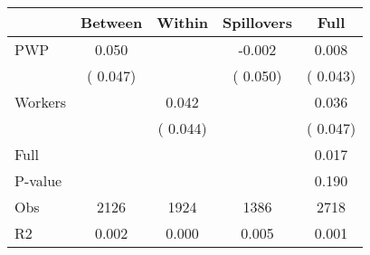 
\begin{tabular}{l*{4}{c}}\hline&\multicolumn{1}{c}{Between}&\multicolumn{1}{c}{Within}&\multicolumn{1}{c}{Spillovers}&\multicolumn{1}{c}{Full}\\ \hline
 PWP           &              0.050      &                                               &       -0.002 &         0.008                            \\ 
                               &        (       0.047)           &                                       &       (       0.050)     &      (       0.043)                                           \\ 
 Workers       &                                               &        0.042    &                                &             0.036                            \\ 
                               &                                               & (       0.044)                  &                                        &      (       0.047)                                           \\ 
\hline                                                                                                                                                                                                                                            
 Full                  &                                               &                                               &                                        &             0.017                                     \\ 
 P-value               &                                               &                                               &                                        &             0.190                                           \\ 
 Obs                   &               2126               &       1924                       &       1386                &              2718                                               \\ 
 R2                    &                      0.002              &              0.000                      &              0.005               &                     0.001                                              \\ 
\hline \end{tabular}                                                                                                                                                                                                              